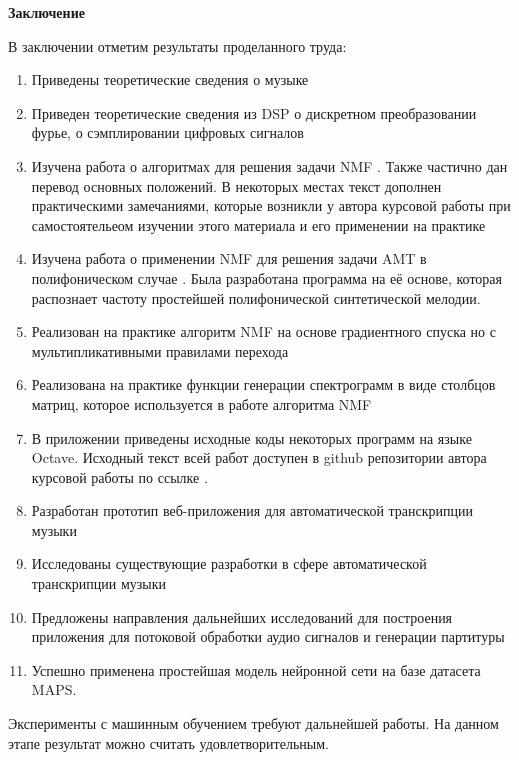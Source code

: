 \documentclass[oneside, final, 12pt]{extarticle}
\begin{document}
{\large \bf Заключение \\}
  В заключении отметим результаты проделанного труда:
  \begin{enumerate}
    \item Приведены теоретические сведения о музыке
    \item Приведен теоретические сведения из DSP о дискретном
      преобразовании фурье, о сэмплировании цифровых сигналов
    \item Изучена работа о алгоритмах для решения задачи NMF \cite{DDL}.
      Также частично дан перевод основных положений. В некоторых
      местах текст дополнен практическими замечаниями, которые
      возникли у автора курсовой работы при самостоятельеом изучении
      этого материала и его применении на практике
    \item Изучена работа о применении NMF для решения задачи AMT
      в полифоническом случае \cite{PMTPS}. Была разработана
      программа на её основе, которая распознает частоту
      простейшей полифонической синтетической мелодии.
    \item Реализован на практике алгоритм NMF на основе градиентного
      спуска но с мультипликативными правилами перехода
    \item Реализована на практике функции генерации спектрограмм
      в виде столбцов матриц, которое используется в работе алгоритма
      NMF
    \item В приложении приведены исходные коды некоторых программ
      на языке Octave. Исходный текст всей работ доступен в github
      репозитории автора курсовой работы по ссылке \cite{L:course-paper}.
    \item Разработан прототип веб-приложения для автоматической
      транскрипции музыки
    \item Исследованы существующие разработки в сфере автоматической
      транскрипции музыки
    \item Предложены направления дальнейших исследований для построения
      приложения для потоковой обработки аудио сигналов и генерации
      партитуры
    \item Успешно применена простейшая модель нейронной сети на базе
      датасета MAPS.
  \end{enumerate}

  Эксперименты с машинным обучением требуют дальнейшей работы.
  На данном этапе результат можно считать удовлетворительным.

\cleardoublepage
\end{document}
